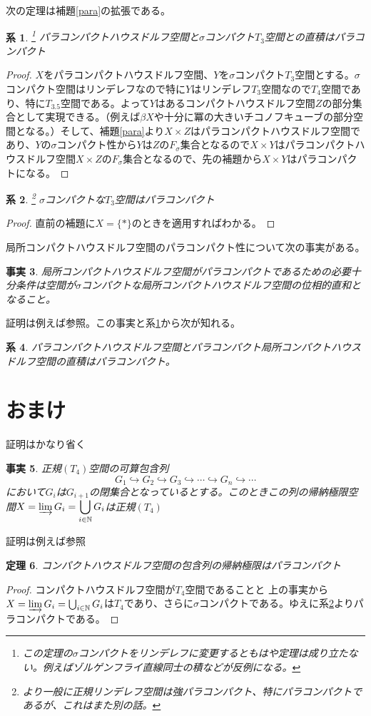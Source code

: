 \documentclass[leqno]{jsarticle}
\newtheorem{thm}{定理}
\newtheorem{cor}[thm]{系}
\newtheorem{fact}[thm]{事実}
\newcommand{\nn}{\mathbb{N}}
\newcommand{\dpst}{\displaystyle}
\newcommand{\be}{\beta}
\begin{document}
次の定理は補題\ref{para}の拡張である。
\begin{cor}\label{hodai}\footnote{この定理の$\sigma$コンパクトをリンデレフに変更するともはや定理は成り立たない。例えばゾルゲンフライ直線同士の積などが反例になる。}
パラコンパクトハウスドルフ空間と$\sigma$コンパクト$T_3$空間との直積はパラコンパクト
\end{cor}
\begin{proof}
$X$をパラコンパクトハウスドルフ空間、$Y$を$\sigma$コンパクト$T_3$空間とする。$\sigma$コンパクト空間はリンデレフなので特に$Y$はリンデレフ$T_3$空間なので$T_4$空間であり、特に$T_{3.5}$空間である。よって$Y$はあるコンパクトハウスドルフ空間$Z$の部分集合として実現できる。（例えば$\be X$や十分に冪の大きいチコノフキューブの部分空間となる。）そして、補題\ref{para}より$X\times Z$はパラコンパクトハウスドルフ空間であり、$Y$の$\sigma$コンパクト性から$Y$は$Z$の$F_{\sigma}$集合となるので$X\times Y$はパラコンパクトハウスドルフ空間$X\times Z$の$F_{\sigma}$集合となるので、先の補題から$X\times Y$はパラコンパクトになる。
\end{proof}


\begin{cor}\label{sigma}\footnote{より一般に正規リンデレフ空間は強パラコンパクト、特にパラコンパクトであるが、これはまた別の話。}
$\sigma $コンパクトな$T_3$空間はパラコンパクト
\end{cor}
\begin{proof}
直前の補題に$X=\{*\}$のときを適用すればわかる。
\end{proof}

局所コンパクトハウスドルフ空間のパラコンパクト性について次の事実がある。
\begin{fact}
局所コンパクトハウスドルフ空間がパラコンパクトであるための必要十分条件は空間が$\sigma$コンパクトな局所コンパクトハウスドルフ空間の位相的直和となること。
\end{fact}
証明は例えば\cite{b}参照。この事実と系\ref{hodai}から次が知れる。
\begin{cor}
パラコンパクトハウスドルフ空間とパラコンパクト局所コンパクトハウスドルフ空間の直積はパラコンパクト。
\end{cor}

\section{おまけ}
証明はかなり省く

\begin{fact}
正規$(T_4)$空間の可算包含列
\[
G_1\hookrightarrow G_2\hookrightarrow G_3\hookrightarrow \cdots \hookrightarrow G_n\hookrightarrow \cdots
\]において$G_i$は$G_{i+1}$の閉集合となっているとする。このときこの列の帰納極限空間$\dpst X=\varinjlim G_i=\bigcup_{i\in \nn}G_i$は正規$(T_4)$
\end{fact}
証明は例えば\cite{4}参照
\begin{thm}
コンパクトハウスドルフ空間の包含列の帰納極限はパラコンパクト
\end{thm}
\begin{proof}コンパクトハウスドルフ空間が$T_4$空間であることと
上の事実から$X=\varinjlim G_i=\bigcup_{i\in \nn}G_i$は$T_4$であり、さらに$\sigma$コンパクトである。ゆえに系\ref{sigma}よりパラコンパクトである。
\end{proof}
\end{document}

